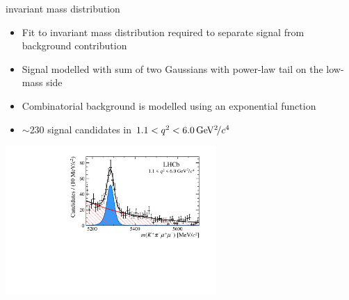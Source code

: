 \documentclass[aspectratio=1610]{beamer}
\begin{document}
\begin{frame}{\mkpimm invariant mass distribution}

\begin{itemize}
  \item Fit to invariant mass distribution required to separate signal from background contribution
  \item Signal modelled with sum of two Gaussians with power-law tail on the low-mass side
  \item Combinatorial background is modelled using an exponential function
  \item $\sim230$ signal candidates in $1.1<{q^2}<6.0{\mathrm{\,Ge\kern -0.1em V^2\!/}c^4}$
\end{itemize}

\begin{center}
\includegraphics[width=0.6\textwidth]{figs/kpimm/massfit/fitKpimumu_q2_1p1_6p0.pdf}
\end{center}

\end{frame}
\end{document}

